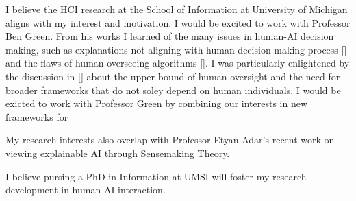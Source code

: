 

I believe the HCI research at the School of Information at University of Michigan aligns with my interest and motivation.
I would be excited to work with Professor Ben Green. 
From his works I learned of the many issues in human-AI decision making, such as explanations not aligning with human decision-making process [] and the flaws of human overseeing algorithms []. 
I was particularly enlightened by the discussion in [] about the upper bound of human oversight and the need for broader frameworks that do not soley depend on human individuals. I would be exicted to work with Professor Green by combining our interests in new frameworks for 

My research interests also overlap with Professor Etyan Adar's recent work on viewing explainable AI through Sensemaking Theory. 

I believe pursing a PhD in Information at UMSI will foster my research development in human-AI interaction.



